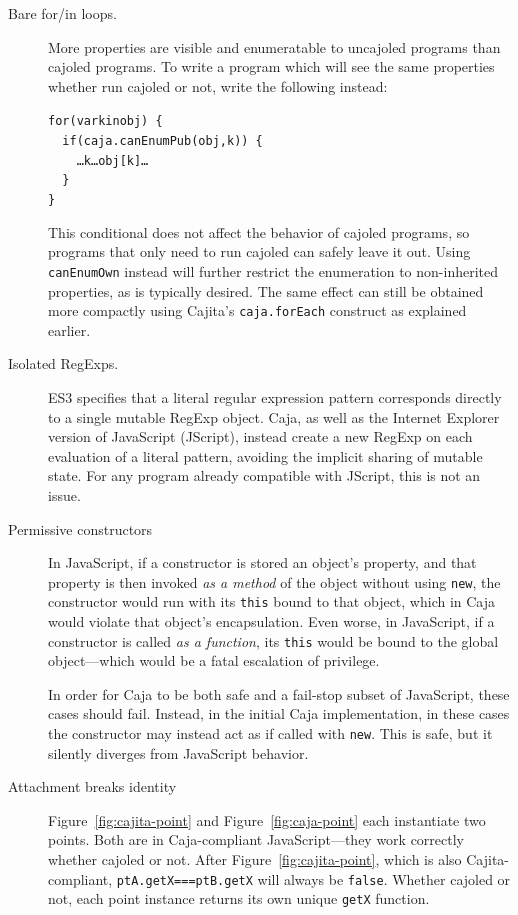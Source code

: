 \documentclass[letterpaper,twocolumn,10pt]{article}
\newcommand{\code}[1]{{\tt {#1}}}              %
\begin{document}
\begin{description}

  \item[Bare for/in loops.] More properties are visible and enumeratable to 
  uncajoled programs than cajoled programs. To write a program which 
  will see the same properties whether run cajoled or not, write the 
  following instead:
%
\begin{alltt}
for (var k in obj)\ \{ 
\ \ if (caja.canEnumPub(obj,k))\ \{
\ \ \ \ {\ldots}k{\ldots}obj[k]\ldots
\ \ \}
\}
\end{alltt}
%
  This conditional does not affect the behavior of cajoled programs, so
  programs that only need to run cajoled can safely leave it out. Using
  \code{canEnumOwn} instead will further restrict the enumeration to
  non-inherited properties, as is typically desired. The same effect can still
  be obtained more compactly using Cajita's \code{caja.forEach} construct as
  explained earlier.

  \item[Isolated RegExps.] ES3 specifies that a literal regular expression 
  pattern corresponds directly to a single mutable RegExp object. Caja, as 
  well as the Internet Explorer version of JavaScript (JScript), instead 
  create a new RegExp on each evaluation of a literal pattern, avoiding the 
  implicit sharing of mutable state. For any program already compatible with 
  JScript, this is not an issue.
  
  \item[Permissive constructors] In JavaScript, if a constructor is stored an 
  object's property, and that property is then invoked \emph{as a method} of 
  the object without using \code{new}, the constructor would run with its 
  \code{this} bound to that object, which in Caja would violate that object's 
  encapsulation. Even worse, in JavaScript, if a constructor is called 
  \emph{as a function}, its \code{this} would be bound to the global 
  object---which would be a fatal escalation of privilege.
  
  In order for Caja to be both safe and a fail-stop subset of JavaScript, 
  these cases should fail. Instead, in the initial Caja implementation, in 
  these cases the constructor may instead act as if called with \code{new}. 
  This is safe, but it silently diverges from JavaScript behavior.
  
  \item[Attachment breaks identity] Figure~\ref{fig:cajita-point} and 
  Figure~\ref{fig:caja-point} each instantiate two points. Both are in 
  Caja-compliant JavaScript---they work correctly whether cajoled or not. 
  After Figure~\ref{fig:cajita-point}, which is also Cajita-compliant, 
  \code{ptA.getX===ptB.getX} will always be \code{false}. Whether cajoled or 
  not, each point instance returns its own unique \code{getX} function.
  

\end{description}
\end{document}
